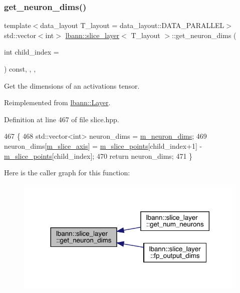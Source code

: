 \subsubsection{\texorpdfstring{get\+\_\+neuron\+\_\+dims()}{get\_neuron\_dims()}}
{\footnotesize\ttfamily template$<$data\+\_\+layout T\+\_\+layout = data\+\_\+layout\+::\+D\+A\+T\+A\+\_\+\+P\+A\+R\+A\+L\+L\+EL$>$ \\
std\+::vector$<$int$>$ \hyperlink{classlbann_1_1slice__layer}{lbann\+::slice\+\_\+layer}$<$ T\+\_\+layout $>$\+::get\+\_\+neuron\+\_\+dims (\begin{DoxyParamCaption}\item[{int}]{child\+\_\+index = {} }\end{DoxyParamCaption}) const\hspace{0.3cm}{\ttfamily [inline]}, {\ttfamily [override]}, {\ttfamily [protected]}, {\ttfamily [virtual]}}

Get the dimensions of an activations tensor. 

Reimplemented from \hyperlink{classlbann_1_1Layer_a54f53393fadbfdc73b4e72489c868433}{lbann\+::\+Layer}.



Definition at line 467 of file slice.\+hpp.


\begin{DoxyCode}
467                                                                      \{
468     std::vector<int> neuron\_dims = \hyperlink{classlbann_1_1Layer_abb34bb8031f57a483e2e327a5f229f48}{m\_neuron\_dims};
469     neuron\_dims[\hyperlink{classlbann_1_1slice__layer_a349dcd71f67d77d40247da24e4641ea2}{m\_slice\_axis}] = \hyperlink{classlbann_1_1slice__layer_af79dab13a70da2e81209e7ae15166e30}{m\_slice\_points}[child\_index+1] - 
      \hyperlink{classlbann_1_1slice__layer_af79dab13a70da2e81209e7ae15166e30}{m\_slice\_points}[child\_index];
470     \textcolor{keywordflow}{return} neuron\_dims;
471   \}
\end{DoxyCode}
Here is the caller graph for this function\+:\nopagebreak
\begin{figure}[H]
\begin{center}
\leavevmode
\includegraphics[width=317pt]{classlbann_1_1slice__layer_a824178abe2450bd331304ab0d50214ce_icgraph}
\end{center}
\end{figure}
\mbox{\label{classlbann_1_1slice__layer_ab36016849a59dfa23d37fd0cd2ec943c}} 
